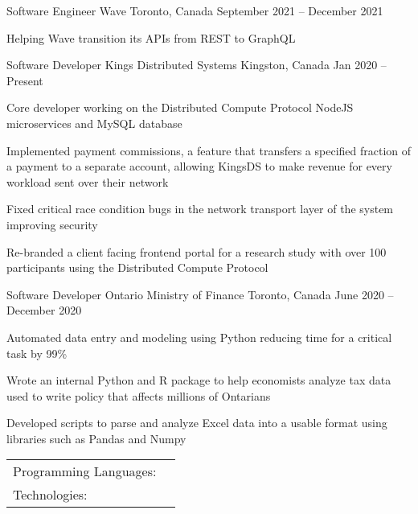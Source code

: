 \documentclass[]{awesome-cv}
\begin{document}
\vspace{-2mm}
\begin{cventries}
	\cventry
	{Software Engineer}
	{Wave}
	{Toronto, Canada}
	{September 2021 – December 2021}
	{\begin{cvitems}
		\item {Helping Wave transition its APIs from REST to GraphQL}
		\end{cvitems}}
  \cventry
	{Software Developer}
	{Kings Distributed Systems}
	{Kingston, Canada}
	{Jan 2020 – Present}
	{\begin{cvitems}
    \item {Core developer working on the Distributed Compute Protocol NodeJS microservices and MySQL database}
		\item {Implemented payment commissions, a feature that transfers a specified fraction of a payment to a separate account, allowing KingsDS to make revenue for every workload sent over their network}
		\item {Fixed critical race condition bugs in the network transport layer of the system improving security}
		\item {Re-branded a client facing frontend portal for a research study with over 100 participants using the Distributed Compute Protocol}
		\end{cvitems}}
	\cventry
	{Software Developer}
	{Ontario Ministry of Finance}
	{Toronto, Canada}
	{June 2020 – December 2020}
	{\begin{cvitems}
		\item {Automated data entry and modeling using Python reducing time for a critical task by 99\%}
		\item {Wrote an internal Python and R package to help economists analyze tax data used to write policy that affects millions of Ontarians}
		\item {Developed scripts to parse and analyze Excel data into a usable format using libraries such as Pandas and Numpy}
		\end{cvitems}}
\end{cventries}
\begin{cventries}
	\cventry
	{}
	{\def\arraystretch{1.15}{\begin{tabular}{ l l }
		Programming Languages:  & {\skill{ JavaScript, C, Python, Kotlin, Java, Shell / Bash, SQL, R, Perl}} \\
		Technologies:  & {\skill{ Node.js, Linux, Android Studio, GraphQL, AWS, Express.js, Tensorflow}} \\
		\end{tabular}}}
	{}
	{}
	{}
\end{cventries}
\end{document}
